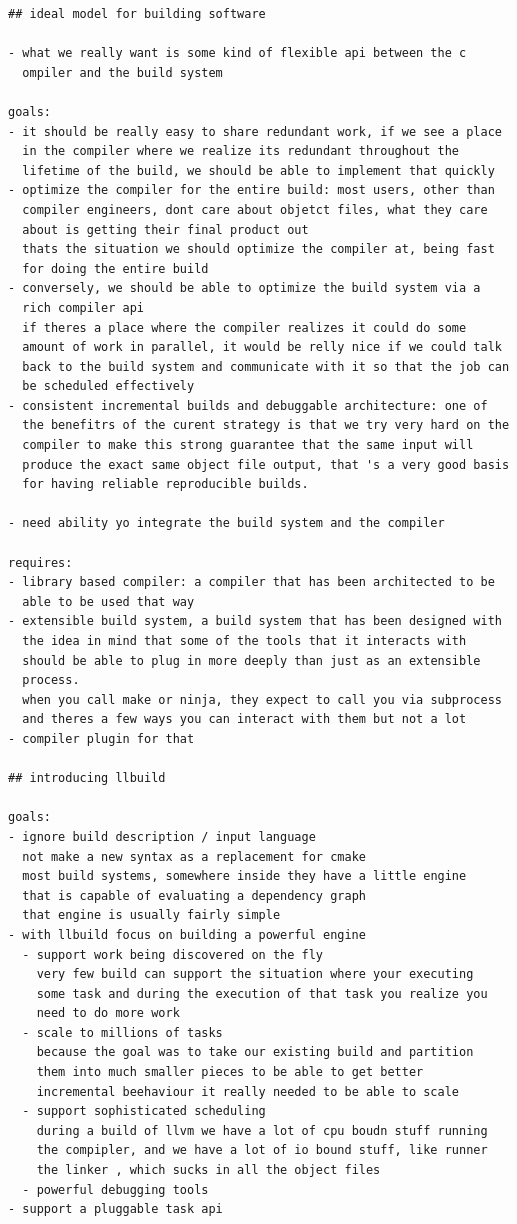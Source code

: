 \documentclass[12pt, a4paper]{report}
\begin{document}
\begin{verbatim}
## ideal model for building software

- what we really want is some kind of flexible api between the c
  ompiler and the build system

goals:
- it should be really easy to share redundant work, if we see a place
  in the compiler where we realize its redundant throughout the
  lifetime of the build, we should be able to implement that quickly
- optimize the compiler for the entire build: most users, other than
  compiler engineers, dont care about objetct files, what they care
  about is getting their final product out
  thats the situation we should optimize the compiler at, being fast
  for doing the entire build
- conversely, we should be able to optimize the build system via a
  rich compiler api
  if theres a place where the compiler realizes it could do some
  amount of work in parallel, it would be relly nice if we could talk
  back to the build system and communicate with it so that the job can
  be scheduled effectively
- consistent incremental builds and debuggable architecture: one of
  the benefitrs of the curent strategy is that we try very hard on the
  compiler to make this strong guarantee that the same input will
  produce the exact same object file output, that 's a very good basis
  for having reliable reproducible builds.

- need ability yo integrate the build system and the compiler

requires:
- library based compiler: a compiler that has been architected to be
  able to be used that way
- extensible build system, a build system that has been designed with
  the idea in mind that some of the tools that it interacts with
  should be able to plug in more deeply than just as an extensible
  process.
  when you call make or ninja, they expect to call you via subprocess
  and theres a few ways you can interact with them but not a lot
- compiler plugin for that

## introducing llbuild

goals:
- ignore build description / input language
  not make a new syntax as a replacement for cmake
  most build systems, somewhere inside they have a little engine
  that is capable of evaluating a dependency graph
  that engine is usually fairly simple
- with llbuild focus on building a powerful engine
  - support work being discovered on the fly
    very few build can support the situation where your executing
    some task and during the execution of that task you realize you
    need to do more work
  - scale to millions of tasks
    because the goal was to take our existing build and partition
    them into much smaller pieces to be able to get better
    incremental beehaviour it really needed to be able to scale
  - support sophisticated scheduling
    during a build of llvm we have a lot of cpu boudn stuff running
    the compipler, and we have a lot of io bound stuff, like runner
    the linker , which sucks in all the object files
  - powerful debugging tools
- support a pluggable task api


\end{verbatim}
\end{document}
